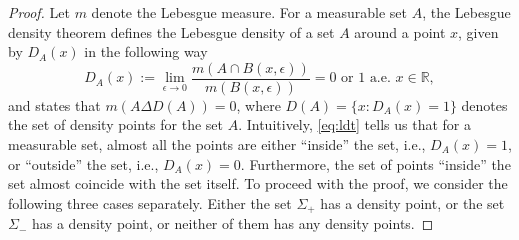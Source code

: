 \documentclass{article}
\begin{document}
\begin{proof}[Proof]
  Let $m$ denote the Lebesgue measure. For a measurable set $A$, the
  Lebesgue density theorem \cite{realanalysis_steinshakarchi} defines
  the Lebesgue density of a set $A$ around a point $x$, given by
  $D_A(x)$ in the following way
  \begin{equation}
    \label{eq:ldt}
    D_{A }(x) := \lim_{\epsilon\rightarrow 0} \frac{m(A\cap
    B(x,\epsilon))}{m(B(x,\epsilon))} =  0 \mbox{ or } 1 \mbox{ a.e.
    }x\in\mathbb{R},
  \end{equation}
  and states that $m(A\Delta D(A))=0$, where $D(A) = \{x:D_A(x) =1\} $ denotes the
  set of density points for the set $A$. Intuitively, \cref{eq:ldt} tells us that
  for a measurable set, almost all the points are either  ``inside''
  the set, i.e., $D_A(x)=1$, or
  ``outside'' the set, i.e., $D_A(x)=0$. Furthermore, the set of points ``inside'' the set almost
  coincide with the set itself.
  To proceed with the proof, we consider the following three cases
  separately. Either the set ${\Sigma_+}$ has a density point, or
  the set
  ${\Sigma_-}$ has a density point, or neither of them has any
  density points.


\end{proof}
\end{document}
